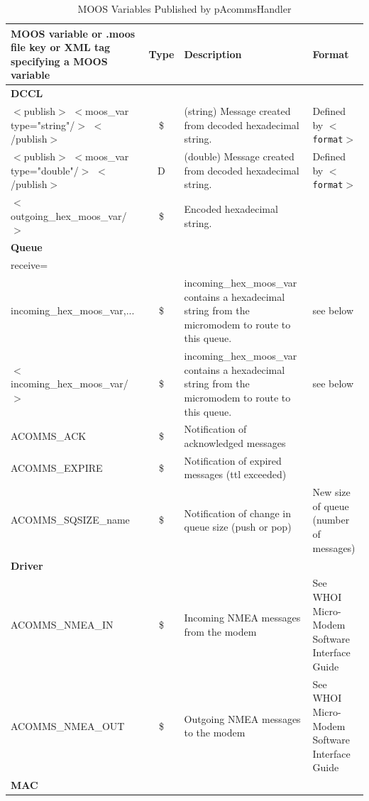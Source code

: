 \documentclass[11pt, letterpaper, oneside]{memoir}
\newcommand{\xmltag}[1]{\texttt{$<$#1$>$}}
\begin{document}
\begin{itemize}
\begin{table}
\centering
\footnotesize
\begin{tabular}{|p{}|c|p{}|p{}|}
\hline MOOS variable or .moos file key or XML tag specifying a MOOS variable & Type & Description & Format \\ \hline 
\hline \textbf{DCCL} &&& \\ \hline\hline
$<$publish$>$ $<$moos\_var type="string"/$>$ $<$/publish$>$& \$ & (string) Message created from decoded hexadecimal string. & Defined by \xmltag{format} \\ \hline
$<$publish$>$ $<$moos\_var type="double"/$>$ $<$/publish$>$& D & (double) Message created from decoded hexadecimal string. & Defined by \xmltag{format} \\ \hline
$<$outgoing\_hex\_moos\_var/$>$ & \$ & Encoded hexadecimal string. &  \\ \hline
\hline \textbf{Queue} &&& \\ \hline\hline
receive= &&&\\incoming\_hex\_moos\_var,... & \$ & incoming\_hex\_moos\_var contains a hexadecimal string from the micromodem to route to this queue. & see below \\ 
\hline $<$incoming\_hex\_moos\_var/$>$ & \$ & incoming\_hex\_moos\_var contains a hexadecimal string from the micromodem to route to this queue. & see below \\  \hline
ACOMMS\_ACK& \$ & Notification of acknowledged messages &  \\ \hline
ACOMMS\_EXPIRE& \$ & Notification of expired messages (ttl exceeded) &  \\ \hline
ACOMMS\_SQSIZE\_name & \$ & Notification of change in queue size (push or pop) & New size of queue (number of messages) \\ \hline
\hline \textbf{Driver} &&& \\ \hline\hline
ACOMMS\_NMEA\_IN & \$ & Incoming NMEA messages from the modem & See WHOI Micro-Modem Software Interface Guide \\ \hline
ACOMMS\_NMEA\_OUT & \$ & Outgoing NMEA messages to the modem & See WHOI Micro-Modem Software Interface Guide \\ \hline
\hline \textbf{MAC} &&& \\ \hline\hline
 \end{tabular}
 \caption{MOOS Variables Published by pAcommsHandler} \label{tab:pAcommsHandler:publish}
\end{table}


\end{itemize}
\end{document}
